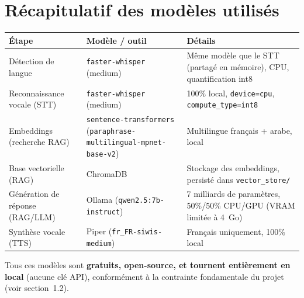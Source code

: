 \documentclass[11pt,a4paper]{report}
\begin{document}
\section{Récapitulatif des modèles utilisés}

\begin{center}
\begin{longtable}{@{}p{4cm}p{4cm}p{6cm}@{}}
\toprule
\textbf{Étape} & \textbf{Modèle / outil} & \textbf{Détails} \\
\midrule
\endhead
Détection de langue & \texttt{faster-whisper} (medium) & Même modèle que le STT (partagé
en mémoire), CPU, quantification int8 \\
Reconnaissance vocale (STT) & \texttt{faster-whisper} (medium) & 100\% local,
\texttt{device=cpu}, \texttt{compute\_type=int8} \\
Embeddings (recherche RAG) & \texttt{sentence-transformers} \newline
(\texttt{paraphrase-multilingual-mpnet-base-v2}) & Multilingue français + arabe, local \\
Base vectorielle (RAG) & ChromaDB & Stockage des embeddings, persisté dans
\texttt{vector\_store/} \\
Génération de réponse (RAG/LLM) & Ollama \newline (\texttt{qwen2.5:7b-instruct}) & 7
milliards de paramètres, 50\%/50\% CPU/GPU (VRAM limitée à 4~Go) \\
Synthèse vocale (TTS) & Piper \newline (\texttt{fr\_FR-siwis-medium}) & Français
uniquement, 100\% local \\
\bottomrule
\end{longtable}
\end{center}

Tous ces modèles sont \textbf{gratuits, open-source, et tournent entièrement en local}
(aucune clé API), conformément à la contrainte fondamentale du projet (voir
section~1.2).
\end{document}
